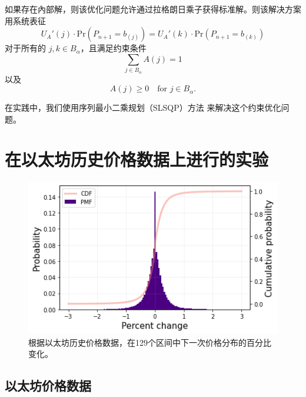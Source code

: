 \documentclass[sigconf, dvipsnames]{acmart}
\newcommand{\dcp}[1]{\textcolor{blue}{{\scriptsize{David:}}#1}}
\newcommand{\rithvik}[1]{\textcolor{cyan}{{\scriptsize{Rithvik: }}[[#1]]}}
\newcommand*{\util}{U_A}
\begin{document}
如果存在內部解，则该优化问题允许通过拉格朗日乘子获得标准解。则该解决方案用系统表征
$$\util'(j) \cdot \mathrm{Pr}\left(P_{n+1} = b_{(j)}\right)  = \util'(k) \cdot\mathrm{Pr}\left(P_{n+1} = b_{(k)}\right) $$
对于所有的 $j, k \in B_{\alpha}$，且满足约束条件
$$\sum_{j \in B_{\alpha}} A(j) = 1$$
以及
$$A(j) \geq 0 \quad \text{for } j \in B_{\alpha}.$$




在实践中，我们使用序列最小二乘规划（SLSQP）方法 \cite{boggs1995sequential} 来解决这个约束优化问题。

\section{在以太坊历史价格数据上进行的实验}
\label{sec:results}


\begin{figure}
    \centering
    \includegraphics[width=\linewidth]{img/eth_dist.png}
    \caption{根据以太坊历史价格数据，在129个区间中下一次价格分布的百分比变化。
    \label{fig:eth_dist}}
\end{figure}

\subsection{以太坊价格数据}
\end{document}
